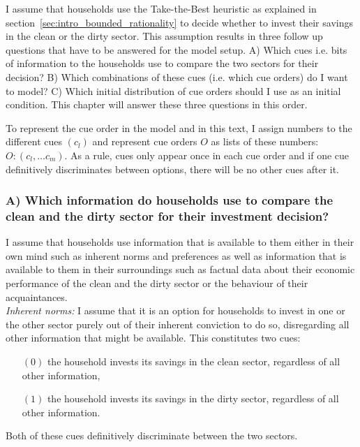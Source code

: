 I assume that households use the Take-the-Best heuristic as explained in section~\ref{sec:intro_bounded_rationality} to decide whether to invest their savings in the clean or the dirty sector. This assumption results in three follow up questions that have to be answered for the model setup. A) Which cues i.e. bits of information to the households use to compare the two sectors for their decision? B) Which combinations of these cues (i.e. which cue orders) do I want to model? C) Which initial distribution of cue orders should I use as an initial condition. This chapter will answer these three questions in this order.

To represent the cue order in the model and in this text, I assign numbers to the different cues $(c_l)$ and represent cue orders $O$ as lists of these numbers: $O: (c_l,\dots c_m)$. As a rule, cues only appear once in each cue order and if one cue definitively discriminates between options, there will be no other cues after it.

\subsubsection*{A) Which information do households use to compare the clean and the dirty sector for their investment decision?}
I assume that households use information that is available to them either in their own mind such as inherent norms and preferences as well as information that is available to them in their surroundings such as factual data about their economic performance of the clean and the dirty sector or the behaviour of their acquaintances.\\

\textit{Inherent norms:}
I assume that it is an option for households to invest in one or the other sector purely out of their inherent conviction to do so, disregarding all other information that might be available. This constitutes two cues: 
\begin{itemize}
  \item [ $(0)$ ] the household invests its savings in the clean sector, regardless of all other information,
  \item [ $(1)$ ] the household invests its savings in the dirty sector, regardless of all other information.
\end{itemize}
Both of these cues definitively discriminate between the two sectors.\\


